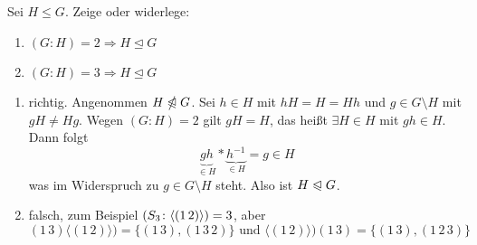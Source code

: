 \begin{exercisePage}
\setcounter{taskcount}{40}

\begin{exercise}[Präsenz]
	Sei $H\le G$. Zeige oder widerlege:
	\begin{enumerate}[label=\alph*)]
		\item $(G\colon H) = 2\Rightarrow H\unlhd G$
		\item $(G\colon H) = 3\Rightarrow H\unlhd G$
	\end{enumerate}
\end{exercise}
\begin{solution}
	\begin{enumerate}[leftmargin=*, label=\alph*)]
		\item richtig. Angenommen $H \mathrel{\ntrianglelefteqslant} G$. Sei $h\in H$ mit $hH=H=Hh$ und $g \in G \setminus H$ mit $gH \neq Hg$. Wegen $(G\colon H)=2$ gilt $gH=H$, das heißt $\exists H \in H$ mit $gh \in H$. Dann folgt
		\begin{equation}
			\underbrace{gh}_{\in H} * \underbrace{h^{-1}}_{\in H} = g \in H
		\end{equation}
		was im Widerspruch zu $g\in G \setminus H$ steht. Also ist $H \mathrel{\trianglelefteqslant} G$.
		\item falsch, zum Beispiel $(S_3 \colon \langle (1\, 2) \rangle)=3$, aber
		\begin{equation*}
			(1\, 3)\langle (1\, 2)\rangle) = \{(1\, 3),(1\, 3\, 2)\} \text{ und }
			\langle (1\, 2)\rangle)(1\, 3) = \{(1\, 3),(1\, 2\, 3)\}
		\end{equation*}
	\end{enumerate}
\end{solution}


\end{exercisePage}